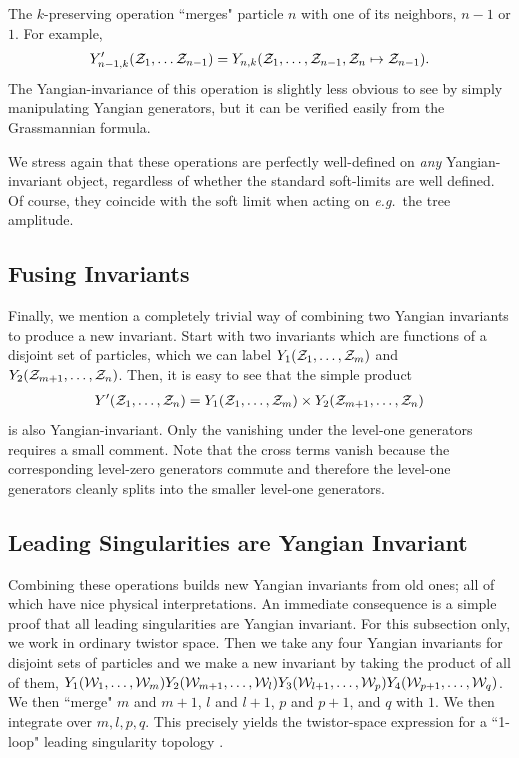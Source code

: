 \documentclass[11pt, reqno]{article}
\newcommand{\be}{\begin{eqnarray}}
\newcommand{\ee}{\end{eqnarray}}
\begin{document}
The $k$-preserving operation ``merges" particle $n$ with one of its
neighbors, $n-1$ or $1$. For example,
\be Y^\prime_{n-1,k}({\cal Z}_1, \ldots {\cal
Z}_{n-1})=Y_{n,k}({\cal Z}_1, \ldots, {\cal
Z}_{n-1}, {\cal Z}_{n}\mapsto{\cal Z}_{n-1}).  \ee
The Yangian-invariance of this operation is slightly less obvious to see by simply manipulating Yangian generators, but it can be verified easily from the Grassmannian formula.

We stress again that these operations are perfectly well-defined on {\it any} Yangian-invariant object, regardless of whether the standard soft-limits are well defined. Of course, they coincide with the soft limit when acting on {\it e.g.}~the tree amplitude.


\subsection{Fusing Invariants}

Finally, we mention a completely trivial way of combining two Yangian invariants to produce a new invariant. Start with two invariants
which are functions of a disjoint set of particles, which we can
label $Y_1({\cal Z}_1,\ldots,{\cal Z}_m)$ and $Y_2({\cal
Z}_{m+1},\ldots,{\cal Z}_n)$. Then, it is easy to see that the
simple product \be Y^\prime ({\cal Z}_1, \ldots, {\cal Z}_n) =
Y_1({\cal Z}_1,\ldots,{\cal Z}_m) \times Y_2({\cal Z}_{m+1}, \ldots,
{\cal Z}_n) \ee is also Yangian-invariant. Only the vanishing under the level-one generators requires a small comment. Note that the cross terms vanish because the corresponding level-zero generators commute and therefore the level-one generators cleanly splits into the smaller level-one generators.

\newpage
\subsection{Leading Singularities are Yangian Invariant}

Combining these operations builds new Yangian invariants from old
ones; all of which have nice physical interpretations. An immediate
consequence is a simple proof that all leading singularities are
Yangian invariant. For this subsection only, we work in ordinary twistor space.
Then we take any four Yangian invariants for disjoint sets of particles and we make a new
invariant by taking the product of all of them, $Y_1({\cal W}_1,
\ldots, {\cal W}_m) Y_2({\cal W}_{m+1}, \ldots, {\cal W}_l)
Y_3({\cal W}_{l+1}, \ldots, {\cal W}_p) Y_4({\cal
W}_{p+1},\ldots,{\cal W}_q)$. We then ``merge" $m$ and $m+1$, $l$
and $l+1$, $p$ and $p+1$, and $q$ with $1$. We then integrate over
$m,l,p,q$. This precisely yields the twistor-space expression for a
``1-loop" leading singularity topology \cite{Bullimore:2009cb,Kaplan:2009mh}.
\end{document}
